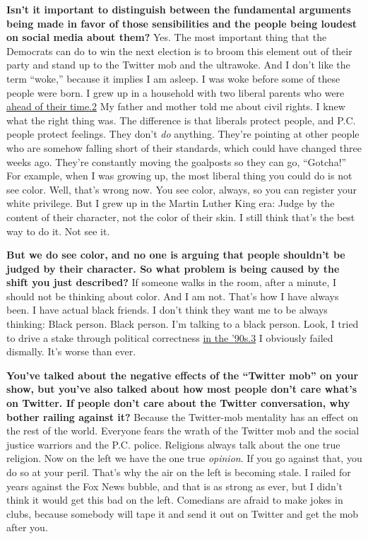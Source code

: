 \textbf{Isn't it important to distinguish between the fundamental
arguments being made in favor of those sensibilities and the people
being loudest on social media about them?} Yes. The most important thing
that the Democrats can do to win the next election is to broom this
element out of their party and stand up to the Twitter mob and the
ultrawoke. And I don't like the term ``woke,'' because it implies I am
asleep. I was woke before some of these people were born. I grew up in a
household with two liberal parents who were
\href{http://nytimes3xbfgragh.onion\#tooltip-2}{ahead of their
time}\href{http://nytimes3xbfgragh.onion\#tooltip-2}{.2} My father and
mother told me about civil rights. I knew what the right thing was. The
difference is that liberals protect people, and P.C. people protect
feelings. They don't \emph{do} anything. They're pointing at other
people who are somehow falling short of their standards, which could
have changed three weeks ago. They're constantly moving the goalposts so
they can go, ``Gotcha!'' For example, when I was growing up, the most
liberal thing you could do is not see color. Well, that's wrong now. You
see color, always, so you can register your white privilege. But I grew
up in the Martin Luther King era: Judge by the content of their
character, not the color of their skin. I still think that's the best
way to do it. Not see it.

\textbf{But we do see color, and no one is arguing that people shouldn't
be judged by their character. So what problem is being caused by the
shift you just described?} If someone walks in the room, after a minute,
I should not be thinking about color. And I am not. That's how I have
always been. I have actual black friends. I don't think they want me to
be always thinking: Black person. Black person. I'm talking to a black
person. Look, I tried to drive a stake through political correctness
\href{http://nytimes3xbfgragh.onion\#tooltip-3}{in the
'}\href{http://nytimes3xbfgragh.onion\#tooltip-3}{90s.3} I obviously
failed dismally. It's worse than ever.

\textbf{You've talked about the negative effects of the ``Twitter mob''
on your show, but you've also talked about how most people don't care
what's on Twitter. If people don't care about the Twitter conversation,
why bother railing against it?} Because the Twitter-mob mentality has an
effect on the rest of the world. Everyone fears the wrath of the Twitter
mob and the social justice warriors and the P.C. police. Religions
always talk about the one true religion. Now on the left we have the one
true \emph{opinion}. If you go against that, you do so at your peril.
That's why the air on the left is becoming stale. I railed for years
against the Fox News bubble, and that is as strong as ever, but I didn't
think it would get this bad on the left. Comedians are afraid to make
jokes in clubs, because somebody will tape it and send it out on Twitter
and get the mob after you.

